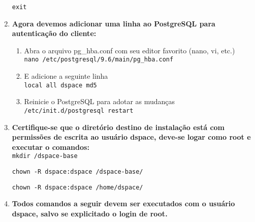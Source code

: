 \documentclass[12pt,hidelinks]{article}
\begin{document}
\begin{enumerate}
             \begin{verbatim}
exit
            \end{verbatim}
            
        \item \textbf{Agora devemos adicionar uma linha ao PostgreSQL para autenticação do cliente:}\\
    
        \begin{enumerate}
            \item Abra o arquivo pg\_hba.conf com seu editor favorito (nano, vi, etc.)\\
            
                \texttt{nano /etc/postgresql/9.6/main/pg\_hba.conf}\\

            \item E adicione a seguinte linha\\
            
                \texttt{local     all     dspace    md5}\\
                
             \item Reinicie o PostgreSQL para adotar as mudanças\\
            
                \texttt{/etc/init.d/postgresql restart}\\

            \end{enumerate}
            
        \item \textbf{Certifique-se que o diretório destino de instalação está com permissões de escrita ao usuário dspace, deve-se logar como root e executar o comandos:}\\
        
            \texttt{mkdir /dspace-base}
            
             \begin{verbatim}
chown -R dspace:dspace /dspace-base/
            \end{verbatim}
            
            \begin{verbatim}
chown -R dspace:dspace /home/dspace/
            \end{verbatim}
            
        \item \textbf{Todos comandos a seguir devem ser executados com o usuário dspace, salvo se explicitado o login de root.}\\
        

\end{enumerate}
\end{document}
